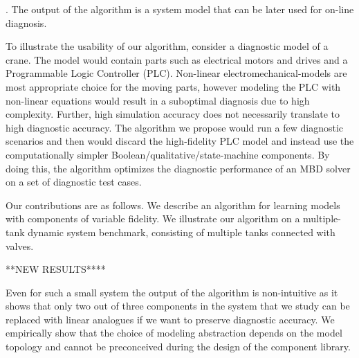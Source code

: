 \citep{feldman10empirical}. The output of the algorithm is a system
model that can be later used for on-line diagnosis.
\par
To illustrate the usability of our algorithm, consider a diagnostic
model of a crane. The model would contain parts such as electrical
motors and drives and a Programmable Logic Controller
(PLC). Non-linear electromechanical-models are most appropriate choice
for the moving parts, however modeling the PLC with non-linear
equations would result in a suboptimal diagnosis due to high
complexity. Further, high simulation accuracy does not necessarily
translate to high diagnostic accuracy. The algorithm we propose would
run a few diagnostic scenarios and then would discard the
high-fidelity PLC model and instead use the computationally simpler
Boolean/qualitative/state-machine components. By doing this, the
algorithm optimizes the diagnostic performance of an MBD solver on a
set of diagnostic test cases.
\par
Our contributions are as follows. We describe an algorithm for
learning models with components of variable fidelity.  We illustrate
our algorithm on a multiple-tank dynamic system benchmark, consisting of multiple tanks connected with valves. 

**NEW RESULTS****

Even for such a
small system the output of the algorithm is non-intuitive as it shows
that only two out of three components in the system that we study can
be replaced with linear analogues if we want to preserve diagnostic
accuracy. We empirically show that the choice of modeling abstraction
depends on the model topology and cannot be preconceived during the
design of the component library.
